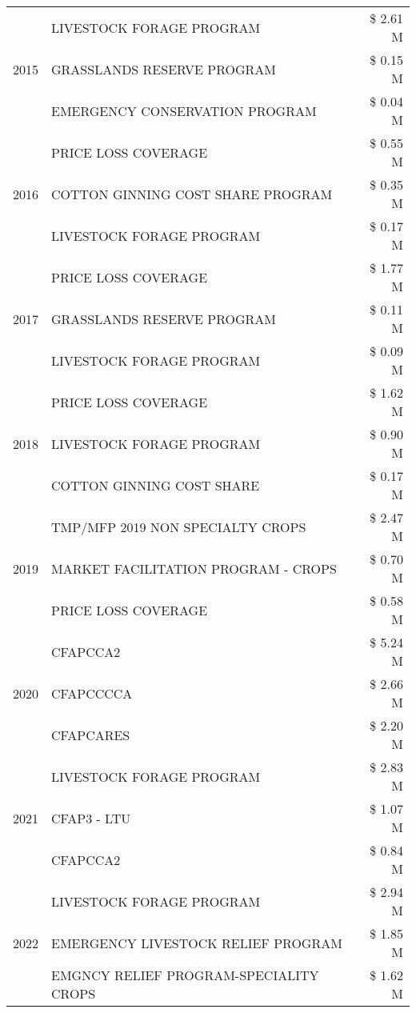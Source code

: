\begin{tabular}{llr}
\cline{1-3}
\multirow[t]{3}{*}{2015} & LIVESTOCK FORAGE PROGRAM & \$ 2.61 M \\
 & GRASSLANDS RESERVE PROGRAM & \$ 0.15 M \\
 & EMERGENCY CONSERVATION PROGRAM & \$ 0.04 M \\
\cline{1-3}
\multirow[t]{3}{*}{2016} & PRICE LOSS COVERAGE & \$ 0.55 M \\
 & COTTON GINNING COST SHARE PROGRAM & \$ 0.35 M \\
 & LIVESTOCK FORAGE PROGRAM & \$ 0.17 M \\
\cline{1-3}
\multirow[t]{3}{*}{2017} & PRICE LOSS COVERAGE & \$ 1.77 M \\
 & GRASSLANDS RESERVE PROGRAM & \$ 0.11 M \\
 & LIVESTOCK FORAGE PROGRAM & \$ 0.09 M \\
\cline{1-3}
\multirow[t]{3}{*}{2018} & PRICE LOSS COVERAGE & \$ 1.62 M \\
 & LIVESTOCK FORAGE PROGRAM & \$ 0.90 M \\
 & COTTON GINNING COST SHARE & \$ 0.17 M \\
\cline{1-3}
\multirow[t]{3}{*}{2019} & TMP/MFP 2019 NON SPECIALTY CROPS & \$ 2.47 M \\
 & MARKET FACILITATION PROGRAM - CROPS & \$ 0.70 M \\
 & PRICE LOSS COVERAGE & \$ 0.58 M \\
\cline{1-3}
\multirow[t]{3}{*}{2020} & CFAPCCA2 & \$ 5.24 M \\
 & CFAPCCCCA & \$ 2.66 M \\
 & CFAPCARES & \$ 2.20 M \\
\cline{1-3}
\multirow[t]{3}{*}{2021} & LIVESTOCK FORAGE PROGRAM & \$ 2.83 M \\
 & CFAP3 - LTU & \$ 1.07 M \\
 & CFAPCCA2 & \$ 0.84 M \\
\cline{1-3}
\multirow[t]{3}{*}{2022} & LIVESTOCK FORAGE PROGRAM & \$ 2.94 M \\
 & EMERGENCY LIVESTOCK RELIEF PROGRAM & \$ 1.85 M \\
 & EMGNCY RELIEF PROGRAM-SPECIALITY CROPS & \$ 1.62 M \\
\cline{1-3}
\bottomrule
\end{tabular}
